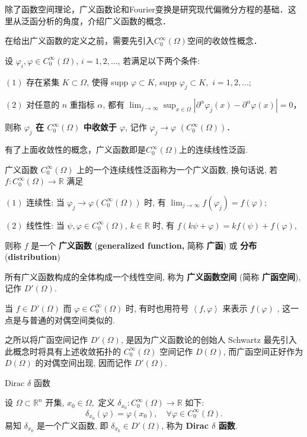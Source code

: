 
除了函数空间理论，广义函数论和Fourier变换是研究现代偏微分方程的基础．这里从泛函分析的角度，介绍广义函数的概念．

在给出广义函数的定义之前，需要先引入$C_0^\infty(\Omega)$空间的收敛性概念．

\begin{definition}{}
设 $\varphi_i,\varphi\in C_0^\infty(\Omega),\,i=1,2,...$,  若满足以下两个条件:

$(1)$ 存在紧集 $K\subset\Omega$, 使得 supp $\varphi\subset K$, supp $\varphi_{j}\subset K,$
$i=1,2,...;$ 

$(2)$ 对任意的 $n$ 重指标 $\alpha$, 都有 ${\displaystyle \lim_{j\rightarrow\infty}{\displaystyle \sup_{x\in\Omega}\left|\partial^{\alpha}\varphi_{j}(x)-\partial^{\alpha}\varphi(x)\right|=0}}$，


则称\textbf{ \textbf{$\varphi_{j}$ 在 $C_{0}^{\infty}(\Omega)$ 中收敛于 $\varphi$}}, 记作 
$\varphi_{j}\rightarrow\varphi$ $(C_{0}^{\infty}(\Omega))$．

\end{definition}

有了上面收敛性的概念，广义函数即是$C_0^\infty(\Omega)$上的连续线性泛函.

\begin{definition}{广义函数}
$C_{0}^{\infty}(\Omega)$ 上的一个连续线性泛函称为一个广义函数, 换句话说, 若 $f:C_{0}^{\infty}(\Omega)\rightarrow\mathbb{R}$
满足

$(1)$ 连续性: 当 $\varphi_{j}\rightarrow\varphi(C_{0}^{\infty}(\Omega))$
时, 有 ${\displaystyle \lim_{j\rightarrow\infty}f(\varphi_{j})=f(\varphi)}$; 

$(2)$ 线性性: 当 $\psi,\varphi\in C_{0}^{\infty}(\Omega)$, $k\in\mathbb{R}$
时, 有 $f(k\psi+\varphi)=kf(\psi)+f(\varphi),$

则称 $f$ 是一个 \textbf{广义函数} (\textbf{generalized function,} 简称 \textbf{广函}) 或 \textbf{分布} (\textbf{distribution})

所有广义函数构成的全体构成一个线性空间, 称为 \textbf{广义函数空间} (简称 \textbf{广函空间}), 记作 $D'(\Omega)$. 

当 $f\in D'(\Omega)$ 而 $\varphi\in C^\infty_0(\Omega)$ 时, 有时也用符号 $\left \langle f,\varphi \right \rangle $ 来表示 $f(\varphi)$ , 这一点是与普通的对偶空间类似的.

\end{definition}

之所以将广函空间记作 $D'(\Omega)$, 是因为广义函数论的创始人 Schwartz 最先引入此概念时将具有上述收敛拓扑的
$C_{0}^{\infty}(\Omega)$ 空间记作 $D(\Omega)$, 而广函空间正好作为 $D(\Omega)$
的对偶空间出现, 因而记作 $D'(\Omega)$. 
\begin{example}{$\mathrm{Dirac}$ $\delta$ 函数
}

设 $\Omega\subset\mathbb{R}^{n}$ 开集, $x_{0}\in\Omega,$ 定义 $\delta_{x_{0}}:C_{0}^{\infty}(\Omega)\rightarrow\mathbb{R}$
如下: 
\[
\delta_{x_{0}}(\varphi)=\varphi(x_{0}),\quad\forall\varphi\in C_{0}^{\infty}(\Omega).
\]
易知 $\delta_{x_{0}}$ 是一个广义函数, 即 $\delta_{x_{0}}\in D'(\Omega)$, 称为
\textbf{Dirac $\delta$ 函数}. 
\end{example}

